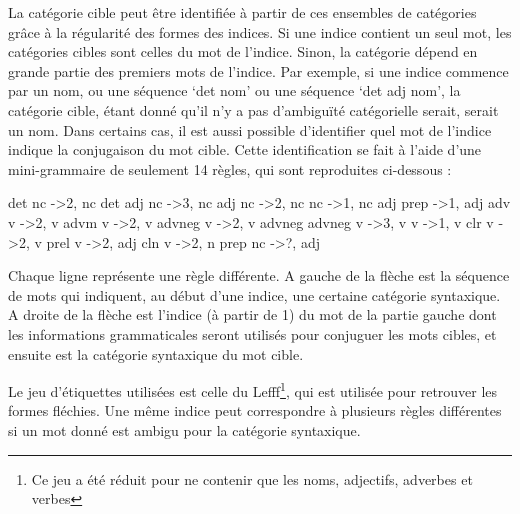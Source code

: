 \documentclass[a4paper, 12pt]{article}
\begin{document}
La catégorie cible peut être identifiée à partir de ces ensembles de catégories 
grâce à la régularité des formes des indices. Si une indice contient un seul 
mot, les catégories cibles sont celles du mot de l'indice. Sinon, la catégorie 
dépend en grande partie des premiers mots de l'indice. Par exemple, si une 
indice commence par un nom, ou une séquence \lq{det nom}\rq{} ou une séquence 
\lq{det adj nom}\rq{}, la catégorie cible, étant donné qu'il n'y a pas 
d'ambiguïté catégorielle serait, serait un nom. Dans certains cas, il est aussi 
possible d'identifier quel mot de l'indice indique la conjugaison du mot cible. 
Cette identification se fait à l'aide d'une mini-grammaire de seulement 14 
règles, qui sont reproduites ci-dessous :

\begin{framed}
det nc -\textgreater 2, nc\newline
det adj nc -\textgreater 3, nc\newline
adj nc -\textgreater 2, nc\newline
nc -\textgreater 1, nc\newline
adj prep -\textgreater 1, adj\newline
adv v -\textgreater 2, v\newline
advm v -\textgreater 2, v\newline
advneg v -\textgreater 2, v\newline
advneg advneg v -\textgreater 3, v\newline
v -\textgreater 1, v\newline
clr v -\textgreater 2, v\newline
prel v -\textgreater 2, adj \newline
cln v -\textgreater 2, n\newline
prep nc -\textgreater ?, adj
\end{framed}

Chaque ligne représente une règle différente. A gauche de la flèche est la 
séquence de mots qui indiquent, au début d'une indice, une certaine catégorie 
syntaxique. A droite de la flèche est l'indice (à partir de 1) du mot de la 
partie gauche dont les informations grammaticales seront utilisés pour conjuguer 
les mots cibles, et ensuite est la catégorie syntaxique du mot cible. 

Le jeu d'étiquettes utilisées est celle du Lefff\footnote{Ce jeu a été réduit 
pour ne contenir que les noms, adjectifs, adverbes et verbes}, qui est utilisée 
pour retrouver les formes fléchies. Une même indice peut correspondre à 
plusieurs règles différentes si un mot donné est ambigu pour la catégorie 
syntaxique.
\end{document}

